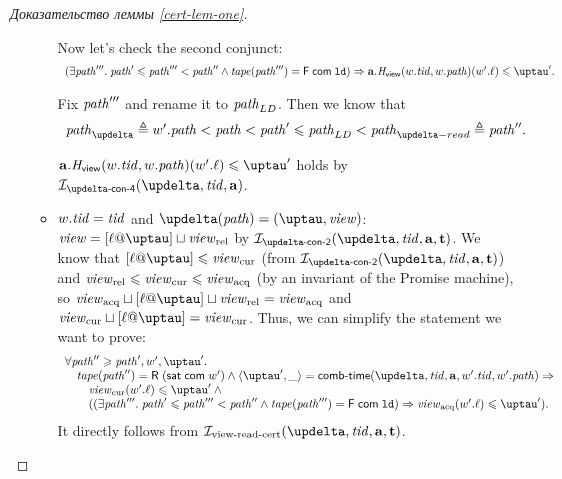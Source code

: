 \begin{proof}[Доказательство леммы \ref{cert-lem-one}]
\begin{itemize}
\begin{itemize}
      Now let's check the second conjunct:
      \[\begin{array}{l}
        (\exists \cpath'''. \; \cpath' \le \cpath''' < \cpath'' \land 
             \tape(\cpath''') = \tapeFence{\Committed}{\LD}) \Rightarrow \aT.\rmap(\w.\tId, \w.\cpath)(\w'.\loc) \le \tau'. \\
      \end{array}\]
      
      Fix $\mathit{path}'''$ and rename it to $\mathit{path}_{LD}$.
      Then we know that
      \[\begin{array}{l}
      \cpath_{\delta} \triangleq \w'.\cpath < \cpath < \cpath' \le \cpath_{LD} < \cpath_{\delta-read} \triangleq \cpath''.
      \end{array}\]

      $\aT.\rmap(\w.\tId, \w.\cpath)(\w'.\loc) \le \tau'$ holds by $\invDeltaDefFour(\delta, \tId, \aT)$.

        \item $w.\mathit{tid} = \mathit{tid}$ and $\delta(\cpath) = (\tau, \R)$: \\
          $\R = [\loc @ \tau] \sqcup \Rrel$ by $\invDeltaDefTwo(\delta, \tId, \aT, \tT)$.
          We know that $[\loc @ \tau] \le \Rcur$ (from $\invDeltaDefTwo(\delta, \tId, \aT, \tT)$) and $\mathit{view}_{\mathrm{rel}} \leqslant \mathit{view}_{\mathrm{cur}} \leqslant \mathit{view}_{\mathrm{acq}}$
          (by an invariant of the Promise machine), so $\Racq \sqcup [\loc @ \tau] \sqcup \Rrel = \Racq$ and
          $\Rcur \sqcup [\loc @ \tau] = \Rcur$.
          Thus, we can simplify the statement we want to prove:
      \[\begin{array}{l}
  \forall \cpath'' \ge \cpath', \w', \tau'. \\
\quad \tape(\cpath'') = \tapeRead{(\tapeSatisfied{\Committed}{\w'})} \land
   \angled{\tau', \_} = \deltaHmap(\delta, \tId, \aT, \w'.\tId, \w'.\cpath) \Rightarrow \\
\qquad \Rcur(\w'.\loc) \le \tau' \land {} \\
\qquad ((\exists \cpath'''. \; \cpath' \le \cpath''' < \cpath'' \land 
             \tape(\cpath''') = \tapeFence{\Committed}{\LD}) \Rightarrow \Racq(\w'.\loc) \le \tau'). \\
      \end{array}\]
      It directly follows from $\invViewReadCERT(\delta, \tId, \aT, \tT)$.
      \end{itemize}


\end{itemize}
\end{proof}
